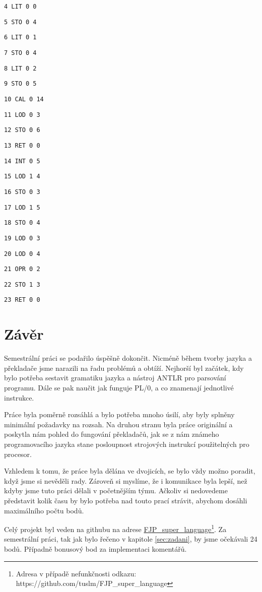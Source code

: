\documentclass[czech]{thesiskiv}
\begin{document}
\texttt{4	LIT	0	0           }

\texttt{5	STO	0	4          }

\texttt{6	LIT	0	1         }

\texttt{7	STO	0	4        }

\texttt{8	LIT	0	2       }

\texttt{9	STO	0	5      }

\texttt{10	CAL	0	14  }

\texttt{11	LOD	0	3  }

\texttt{12	STO	0	6 }

\texttt{13	RET	0	0         }

\texttt{14	INT	0	5        }

\texttt{15	LOD	1	4       }

\texttt{16	STO	0	3      }

\texttt{17	LOD	1	5     }

\texttt{18	STO	0	4    }

\texttt{19	LOD	0	3   }

\texttt{20	LOD	0	4  }

\texttt{21	OPR	0	2 }

\texttt{22	STO	1	3}

\texttt{23	RET	0	0}



\chapter{Závěr}
Semestrální práci se podařilo úspěšně dokončit. Nicméně během tvorby jazyka a překladače
jsme narazili na řadu problémů a obtíží. Nejhorší byl začátek, kdy bylo potřeba sestavit gramatiku jazyka
a nástroj ANTLR pro parsování programu. Dále se pak naučit jak funguje PL/0, a co znamenají jednotlivé instrukce.

Práce byla poměrně rozsáhlá a bylo potřeba mnoho úsilí, aby byly splněny minimální požadavky na rozsah.
Na druhou stranu byla práce originální a poskytla nám pohled do fungování překladačů,
jak se z nám známeho programovacího jazyka stane posloupnost strojových instrukcí použitelných pro procesor.

Vzhledem k tomu, že práce byla dělána ve dvojicích, se bylo vždy možno poradit, když jsme si nevěděli rady.
Zároveň si myslíme, že i komunikace byla lepší, než kdyby jsme tuto práci dělali v početnějším týmu.
Ačkoliv si nedovedeme představit kolik času by bylo potřeba nad touto prací strávit, abychom dosáhli maximálního počtu bodů.

Celý projekt byl veden na githubu na adrese \href{https://github.com/tuslm/FJP\_{super}\_{language}}{FJP\_{super}\_{language}}\footnote{Adresa v případě nefunkčnosti odkazu: https://github.com/tuslm/FJP\_{super}\_{language}}.
Za semestrální práci, tak jak bylo řečeno v kapitole \ref{sec:zadani}, by jsme očekávali 24 bodů. Případně
bonusový bod za implementaci komentářů.
\end{document}
